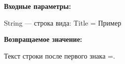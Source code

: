 \textbf{Входные параметры:}
 
String --- строка вида: Title = Пример

\textbf{Возвращаемое значение:}

Текст строки после первого знака =.